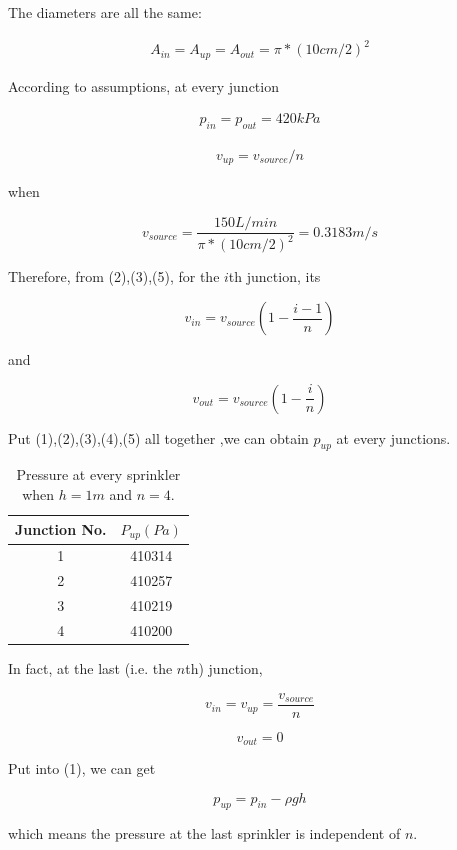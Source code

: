 \documentclass[12pt,a4paper,titlepage]{article}
\begin{document}
The diameters are all the same:

\begin{eqnarray}
A_{in}=A_{up}=A_{out}=\pi*(10cm/2)^2
\end{eqnarray}

According to assumptions, at every junction

\begin{eqnarray}
p_{in}=p_{out}=420kPa
\end{eqnarray}

\begin{eqnarray}
v_{up}=v_{source}/n
\end{eqnarray}

when

\[
v_{source}=\frac{150L/min}{\pi*(10cm/2)^2}=0.3183m/s
\]

Therefore, from (2),(3),(5), for the $i$th junction, its

\[
v_{in}=v_{source}(1-\frac{i-1}{n})
\]

and

\[
v_{out}=v_{source}(1-\frac{i}{n})
\]

Put (1),(2),(3),(4),(5) all together ,we can obtain $p_{up}$ at
every junctions.

\newpage

\begin{table}[!htb]
\centering \caption{Pressure at every sprinkler when $h=1m$ and
$n=4$.}
\begin{tabular}{ll}
\hline
\multicolumn{1}{c}{Junction No.} & \multicolumn{1}{c}{$P_{up}(Pa)$} \\
\hline
\multicolumn{1}{c}{1} & \multicolumn{1}{c}{410314} \\
\multicolumn{1}{c}{2} & \multicolumn{1}{c}{410257} \\
\multicolumn{1}{c}{3} & \multicolumn{1}{c}{410219} \\
\multicolumn{1}{c}{4} & \multicolumn{1}{c}{410200} \\
\hline
\end{tabular}
\end{table}

In fact, at the last (i.e. the $n$th) junction,

\[
v_{in}=v_{up}=\frac{v_{source}}{n}
\]

\[
v_{out}=0
\]

Put into (1), we can get

\[
p_{up}=p_{in}-\rho gh
\]


which means the pressure at the last sprinkler is independent of
$n$.
\end{document}
